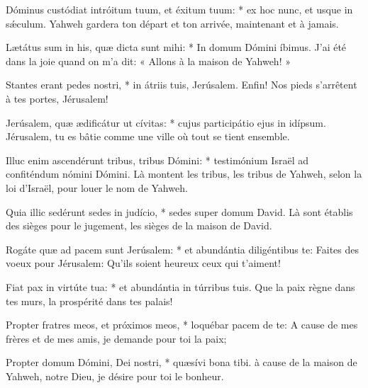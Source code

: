 \begin{paracol}{2}
\LigneParacol
{Dóminus custódiat intróitum tuum, et éxitum tuum: * ex hoc nunc, et usque in sǽculum.}
{Yahweh gardera ton départ et ton arrivée, maintenant et à jamais.}

\LigneParacol
{Lætátus sum in his, quæ dicta sunt mihi: * In domum Dómini íbimus.}
{J'ai été dans la joie quand on m'a dit: « Allons à la maison de Yahweh! »}

\LigneParacol
{Stantes erant pedes nostri, * in átriis tuis, Jerúsalem.}
{Enfin! Nos pieds s'arrêtent à tes portes, Jérusalem!}

\LigneParacol
{Jerúsalem, quæ ædificátur ut cívitas: * cujus participátio ejus in idípsum.}
{Jérusalem, tu es bâtie comme une ville où tout se tient ensemble.}

\LigneParacol
{Illuc enim ascendérunt tribus, tribus Dómini: * testimónium Israël ad confiténdum nómini Dómini.}
{Là montent les tribus, les tribus de Yahweh, selon la loi d'Israël, pour louer le nom de Yahweh.}

\LigneParacol
{Quia illic sedérunt sedes in judício, * sedes super domum David.}
{Là sont établis des sièges pour le jugement, les sièges de la maison de David.}

\LigneParacol
{Rogáte quæ ad pacem sunt Jerúsalem: * et abundántia diligéntibus te:}
{Faites des voeux pour Jérusalem: Qu'ils soient heureux ceux qui t'aiment!}

\LigneParacol
{Fiat pax in virtúte tua: * et abundántia in túrribus tuis.}
{Que la paix règne dans tes murs, la prospérité dans tes palais!}

\LigneParacol
{Propter fratres meos, et próximos meos, * loquébar pacem de te:}
{A cause de mes frères et de mes amis, je demande pour toi la paix;}

\LigneParacol
{Propter domum Dómini, Dei nostri, * quæsívi bona tibi.}
{à cause de la maison de Yahweh, notre Dieu, je désire pour toi le bonheur. }

\end{paracol}
